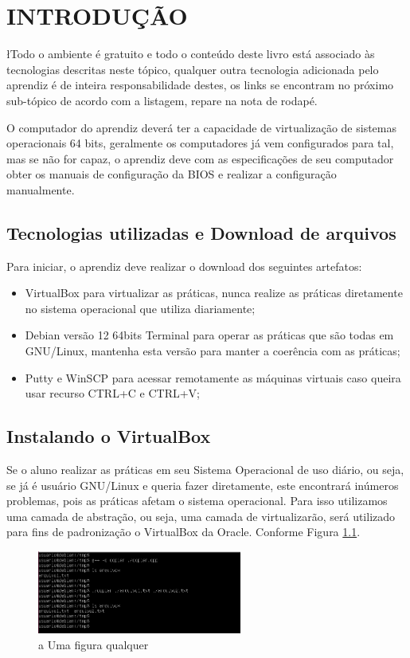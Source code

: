 

\chapter{INTRODUÇÃO}
\l{T}odo o ambiente é gratuito e todo o conteúdo deste livro está associado às tecnologias descritas neste tópico, qualquer outra tecnologia adicionada pelo aprendiz é de inteira responsabilidade destes, os links se encontram no próximo sub-tópico de acordo com a listagem, repare na nota de rodapé.

O computador do aprendiz deverá ter a capacidade de virtualização de sistemas operacionais 64 bits, geralmente os computadores já vem configurados para tal, mas se não for capaz, o aprendiz deve com as especificações de seu computador obter os manuais de configuração da BIOS e realizar a configuração manualmente.

\section{Tecnologias utilizadas e Download de arquivos}
Para iniciar, o aprendiz deve realizar o download dos seguintes artefatos:
\begin{itemize}
	\item VirtualBox para virtualizar as práticas, nunca realize as práticas diretamente no sistema operacional que utiliza diariamente;
	\item Debian versão 12 64bits Terminal para operar as práticas que são todas em GNU/Linux, mantenha esta versão para manter a coerência com as práticas;
	\item Putty e WinSCP para acessar remotamente as máquinas virtuais caso queira usar recurso CTRL+C e CTRL+V;
\end{itemize}



\section{Instalando o VirtualBox}
Se o aluno realizar as práticas em seu Sistema Operacional de uso diário, ou seja, se já é usuário GNU/Linux e queria fazer diretamente, este encontrará inúmeros problemas, pois as práticas afetam o sistema operacional. Para isso utilizamos uma camada de abstração, ou seja, uma camada de virtualizarão, será utilizado para fins de padronização o VirtualBox da Oracle. Conforme Figura \ref{fig:linux1}.

\begin{figure}[h]
	\centering
	\includegraphics[width=0.6\textwidth]{cap/introducao/figure/linux.png}
	\caption{a Uma figura qualquer}
	\label{fig:linux1}
\end{figure}



